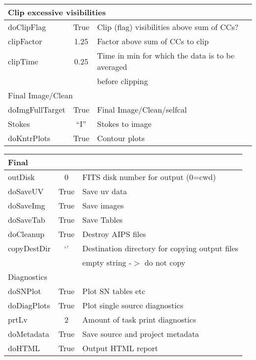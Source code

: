 \documentclass[11pt]{article}
\begin{document}
\begin{center}
\begin{tabular}{|l|c|l|}
\hline
\multicolumn{3}{|l|}{Clip excessive visibilities} \\
\hline
doClipFlag & True & Clip (flag) visibilities above sum of CCs? \\
clipFactor & 1.25 & Factor above sum of CCs to clip \\
clipTime & 0.25 & Time in min for which the data is to be averaged \\
 & & before clipping \\

\hline
\multicolumn{3}{|l|}{Final Image/Clean} \\
\hline
doImgFullTarget & True & Final Image/Clean/selfcal \\
Stokes & ``I'' & Stokes to image \\
doKntrPlots & True & Contour plots \\

\hline
\end{tabular}
\end{center}
\clearpage
\begin{center}
\begin{tabular}{|l|c|l|}

\hline
\multicolumn{3}{|l|}{Final} \\
\hline
outDisk & 0 & FITS disk number for output (0=cwd) \\
doSaveUV & True & Save uv data \\
doSaveImg & True & Save images \\
doSaveTab & True & Save Tables \\
doCleanup & True & Destroy AIPS files \\
copyDestDir & `' & Destination directory for copying output files \\
 & & empty string -$>$ do not copy \\

\hline
\multicolumn{3}{|l|}{Diagnostics} \\
\hline
doSNPlot & True & Plot SN tables etc \\
doDiagPlots & True & Plot single source diagnostics \\
prtLv & 2 & Amount of task print diagnostics \\
doMetadata & True & Save source and project metadata \\
doHTML & True & Output HTML report \\
\hline

\end{tabular}
\end{center}
\end{document}
